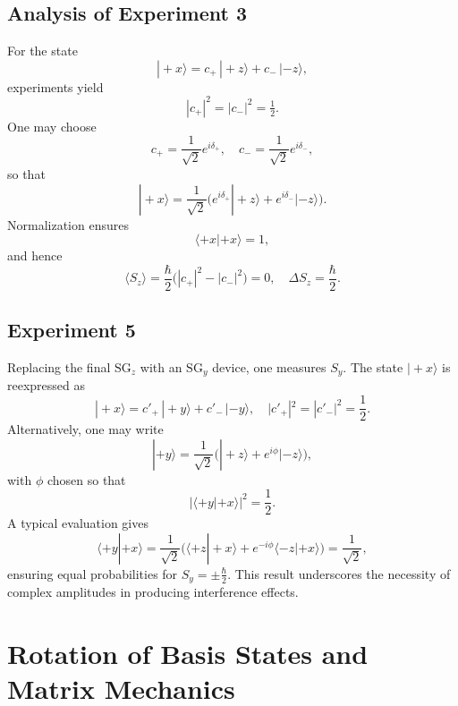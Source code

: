 \documentclass[twocolumn]{article}
\begin{document}
\begin{spacing}{1}
  \subsection{Analysis of Experiment 3}
  For the state  
  $$|\!+\!x\rangle = c_{+}\,|+z\rangle + c_{-}\,|-z\rangle,$$  
  experiments yield  
  $$|c_{+}|^2 = |c_{-}|^2 = \tfrac{1}{2}.$$  
  One may choose  
  $$c_{+} = \frac{1}{\sqrt{2}}e^{i\delta_+},\quad c_{-} = \frac{1}{\sqrt{2}}e^{i\delta_-},$$  
  so that  
  $$|\!+\!x\rangle = \frac{1}{\sqrt{2}}\Big(e^{i\delta_+}|+z\rangle + e^{i\delta_-}|-z\rangle\Big).$$  
  Normalization ensures  
  $$\langle+\!x|+\!x\rangle=1,$$  
  and hence  
  $$\langle S_z\rangle = \frac{\hbar}{2}\Big(|c_{+}|^2 - |c_{-}|^2\Big)=0,\quad \Delta S_z = \frac{\hbar}{2}.$$
  
  \subsection{Experiment 5}
  Replacing the final $\text{SG}_z$ with an $\text{SG}_y$ device, one measures $S_y$.  
  The state $|\!+\!x\rangle$ is reexpressed as  
  $$|\!+\!x\rangle = c'_{+}\,|+y\rangle + c'_{-}\,|-y\rangle,\quad |c'_{+}|^2=|c'_{-}|^2=\frac{1}{2}.$$  
  Alternatively, one may write  
  $$|+y\rangle = \frac{1}{\sqrt{2}}\Big(|+z\rangle + e^{i\phi}|-z\rangle\Big),$$  
  with $\phi$ chosen so that  
  $$\left|\langle+ y|+\!x\rangle\right|^2=\frac{1}{2}.$$  
  A typical evaluation gives  
  $$\langle+ y|+\!x\rangle = \frac{1}{\sqrt{2}}\Big(\langle+z|+\!x\rangle+e^{-i\phi}\langle-z|+\!x\rangle\Big)=\frac{1}{\sqrt{2}},$$  
  ensuring equal probabilities for $S_y=\pm\frac{\hbar}{2}$.  
  This result underscores the necessity of complex amplitudes in producing interference effects.

  \section{Rotation of Basis States and Matrix Mechanics}


\end{spacing}
\end{document}
